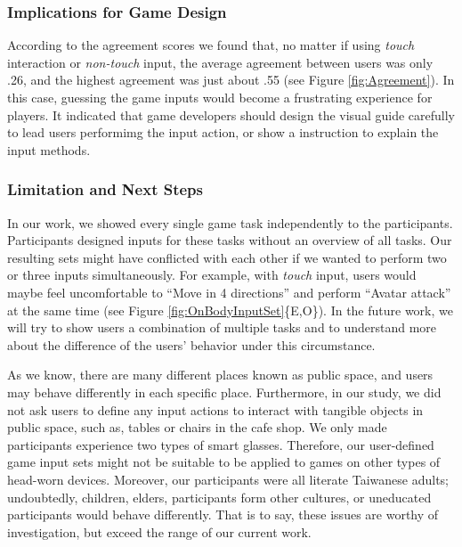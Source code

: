 \documentclass{sigchi}
\begin{document}
  \subsubsection{Implications for Game Design}
  According to the agreement scores we found that, no matter if using \emph{touch} interaction or \emph{non-touch} input, the average agreement between users was only .26, and the highest agreement was just about .55 (see Figure \ref{fig:Agreement}). In this case, guessing the game inputs would become a frustrating experience for players. It indicated that game developers should design the visual guide carefully to lead users performimg the input action, or show a instruction to explain the input methods.




  \subsubsection{Limitation and Next Steps}

  In our work, we showed every single game task independently to the participants. Participants designed inputs for these tasks without an overview of all tasks. Our resulting sets might have conflicted with each other if we wanted to perform two or three inputs simultaneously. For example, with \emph{touch} input, users would maybe feel uncomfortable to ``Move in 4 directions'' and perform ``Avatar attack'' at the same time (see Figure \ref{fig:OnBodyInputSet}\{E,O\}). In the future work, we will try to show users a combination of multiple tasks and to understand more about the difference of the users' behavior under this circumstance.

  As we know, there are many different places known as public space, and users may behave differently in each specific place. Furthermore, in our study, we did not ask users to define any input actions to interact with tangible objects in public space, such as, tables or chairs in the cafe shop. We only made participants experience two types of smart glasses. Therefore, our user-defined game input sets might not be suitable to be applied to games on other types of head-worn devices. Moreover, our participants were all literate Taiwanese adults; undoubtedly, children, elders, participants form other cultures, or uneducated participants would behave differently. That is to say, these issues are worthy of investigation, but exceed the range of our current work.
\end{document}
